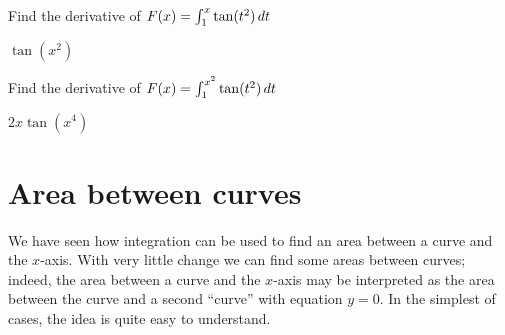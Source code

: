 \begin{exercises}
\begin{exercise} Find the derivative of $F(x)=\int_1^x \tan(t^2)\, d t$
\begin{answer} $\tan(x^2)$
\end{answer}\end{exercise}

\begin{exercise} Find the derivative of $F(x)=\int_1^{x^2} \tan(t^2)\, d t$
\begin{answer} $2x\tan(x^4)$
\end{answer}\end{exercise}

\end{exercises}













\section{Area between curves}

We have seen how integration can be used to find an area between a
curve and the $x$-axis. With very little change we can find some areas
between curves; indeed, the area between a curve and the $x$-axis may
be interpreted as the area between the curve and a second ``curve''
with equation $y=0$. In the simplest of cases, the idea is quite easy
to understand.

